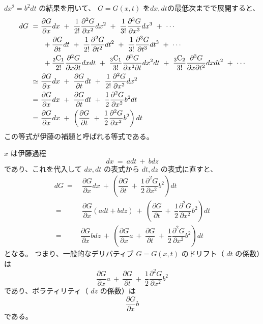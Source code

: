 \documentclass[uplatex,a4j,12pt,dvipdfmx]{jsarticle}
\begin{document}
$dx^{2} = b^{2} dt$
の結果を用いて、 $G=G(x,t)$ を$dx,dt$の最低次までで展開すると、
\begin{align}
	d G
	\ =      & \
	\dfrac{\partial G}{\partial x} d x
	\ + \
	\dfrac{1}{2!} \dfrac{\partial^{2} G}{\partial x^{2}} d x^{2}
	\ + \
	\dfrac{1}{3!} \dfrac{\partial^{3} G}{\partial x^{3}} d x^{3}
	\ + \
	\cdots
	\\
	         & \ \ +
	\dfrac{\partial G}{\partial t} d t
	\ + \
	\dfrac{1}{2!} \dfrac{\partial^{2} G}{\partial t^{2}} d t^{2}
	\ + \
	\dfrac{1}{3!} \dfrac{\partial^{3} G}{\partial t^{3}} d t^{3}
	\ + \
	\cdots
	\\
	         & \ \ +
	\dfrac{ {}_2 {\rm C}_{1} }{2!}
	\dfrac{\partial^{2} G}{\partial x \partial t } d x d t
	\ + \
	\dfrac{ {}_3 {\rm C}_{1} }{3!}
	\dfrac{\partial^{3} G}{\partial x^{2} \partial t } d x^{2} d t
	\ + \
	\dfrac{ {}_3 {\rm C}_{2} }{3!}
	\dfrac{\partial^{3} G}{\partial x \partial t^{2} } d x d t^{2}
	\ + \
	\cdots
	\\
	\ \simeq & \
	\dfrac{\partial G}{\partial x} d x
	\ + \
	\dfrac{\partial G}{\partial t} d t
	\ + \
	\dfrac{1}{2!} \dfrac{\partial^{2} G}{\partial x^{2}} d x^{2}
	\\
	\ =      & \
	\dfrac{\partial G}{\partial x} d x
	\ + \
	\dfrac{\partial G}{\partial t} d t
	\ + \
	\dfrac{1}{2} \dfrac{\partial^{2} G}{\partial x^{2}} b^{2}dt
	\\
	\ =      & \
	\dfrac{\partial G}{\partial x} d x
	\ + \
	\left(
	\dfrac{\partial G}{\partial t}
	\ + \
	\dfrac{1}{2} \dfrac{\partial^{2} G}{\partial x^{2}} b^{2}
	\right)
	dt
\end{align}
この等式が伊藤の補題と呼ばれる等式である。

$x$ は伊藤過程
$$
	dx
	\ = \
	adt
	\ + \
	bdz
$$
であり、これを代入して $dx,dt$ の表式から $dt,dz$ の表式に直すと、
\begin{align}
	d G
	\ = & \
	\dfrac{\partial G}{\partial x} d x
	\ + \
	\left(
	\dfrac{\partial G}{\partial t}
	\ + \
	\dfrac{1}{2} \dfrac{\partial^{2} G}{\partial x^{2}} b^{2}
	\right)
	dt
	\\
	\ = & \
	\dfrac{\partial G}{\partial x} (adt+bdz)
	\ + \
	\left(
	\dfrac{\partial G}{\partial t}
	\ + \
	\dfrac{1}{2} \dfrac{\partial^{2} G}{\partial x^{2}} b^{2}
	\right)
	dt
	\\
	\ = &
	\dfrac{\partial G}{\partial x} bdz
	\ + \
	\left(
	\dfrac{\partial G}{\partial x} a
	\ + \
	\dfrac{\partial G}{\partial t}
	\ + \
	\dfrac{1}{2} \dfrac{\partial^{2} G}{\partial x^{2}} b^{2}
	\right)
	dt
\end{align}
となる。
つまり、一般的なデリバティブ $G=G(x,t)$ のドリフト（ $dt$ の係数）は
$$
	\dfrac{\partial G}{\partial x} a
	\ + \
	\dfrac{\partial G}{\partial t}
	\ + \
	\dfrac{1}{2} \dfrac{\partial^{2} G}{\partial x^{2}} b^{2}
$$
であり、ボラティリティ（ $dz$ の係数）は
$$
	\dfrac{\partial G}{\partial x} b
$$
である。
\end{document}
